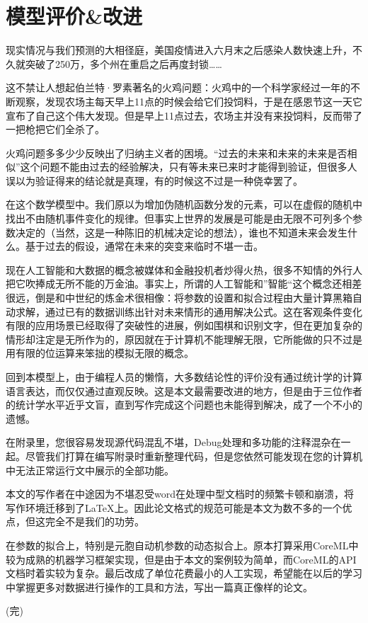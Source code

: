\documentclass[UTF8]{ctexart}
\begin{document}
\section{模型评价\&改进}
\par 
现实情况与我们预测的大相径庭，美国疫情进入六月末之后感染人数快速上升，不久就突破了250万，多个州在重启之后再度封锁……
\par
这不禁让人想起伯兰特·罗素著名的火鸡问题：火鸡中的一个科学家经过一年的不断观察，发现农场主每天早上11点的时候会给它们投饲料，于是在感恩节这一天它宣布了自己这个伟大发现。但是早上11点过去，农场主并没有来投饲料，反而带了一把枪把它们全杀了。
\par 
火鸡问题多多少少反映出了归纳主义者的困境。“过去的未来和未来的未来是否相似”这个问题不能由过去的经验解决，只有等未来已来时才能得到验证，但很多人误以为验证得来的结论就是真理，有的时候这不过是一种侥幸罢了。
\par 
在这个数学模型中。我们原以为增加伪随机函数分发的元素，可以在虚假的随机中找出不由随机事件变化的规律。但事实上世界的发展是可能是由无限不可列多个参数决定的（当然，这是一种陈旧的机械决定论的想法），谁也不知道未来会发生什么。基于过去的假设，通常在未来的突变来临时不堪一击。
\par
现在人工智能和大数据的概念被媒体和金融投机者炒得火热，很多不知情的外行人把它吹捧成无所不能的万金油。事实上，所谓的人工智能和”智能“这个概念还相差很远，倒是和中世纪的炼金术很相像：将参数的设置和拟合过程由大量计算黑箱自动求解，通过已有的数据训练出针对未来情形的通用解决公式。这在客观条件变化有限的应用场景已经取得了突破性的进展，例如围棋和识别文字，但在更加复杂的情形却注定是无所作为的，原因就在于计算机不能理解无限，它所能做的只不过是用有限的位运算来笨拙的模拟无限的概念。
\\
\par 
回到本模型上，由于编程人员的懒惰，大多数结论性的评价没有通过统计学的计算语言表达，而仅仅通过直观反映。这是本文最需要改进的地方，但是由于三位作者的统计学水平近乎文盲，直到写作完成这个问题也未能得到解决，成了一个不小的遗憾。
\par
在附录里，您很容易发现源代码混乱不堪，Debug处理和多功能的注释混杂在一起。尽管我们打算在编写附录时重新整理代码，但是您依然可能发现在您的计算机中无法正常运行文中展示的全部功能。
\par 
本文的写作者在中途因为不堪忍受word在处理中型文档时的频繁卡顿和崩溃，将写作环境迁移到了\LaTeX 上。因此论文格式的规范可能是本文为数不多的一个优点，但这完全不是我们的功劳。
\par 
在参数的拟合上，特别是元胞自动机参数的动态拟合上。原本打算采用CoreML中较为成熟的机器学习框架实现，但是由于本文的案例较为简单，而CoreML的API文档时着实较为复杂。最后改成了单位花费最小的人工实现，希望能在以后的学习中掌握更多对数据进行操作的工具和方法，写出一篇真正像样的论文。
\\
\par 
(完)
\end{document}
